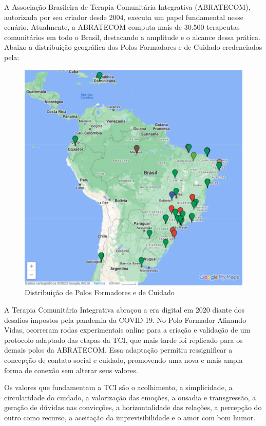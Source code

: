 A Associação Brasileira de Terapia Comunitária Integrativa (ABRATECOM), autorizada por seu criador desde 2004, executa um papel fundamental nesse cenário. Atualmente, a ABRATECOM computa mais de 30.500 terapeutas comunitários em todo o Brasil, destacando a amplitude e o alcance dessa prática.\cite{SILVAFRANCO} Abaixo a distribuição geográfica dos Polos Formadores e de Cuidado credenciados pela\cite{ABRATECOM}:

\begin{figure}[!h] %
    \centering
    \includegraphics[scale=0.7]{latex/figuras/polos.pdf}
    \caption[Terapia Comunitária Integrativa]%
    {Distribuição de Polos Formadores e de Cuidado}%
\end{figure}

A Terapia Comunitária Integrativa abraçou a era digital em 2020 diante dos desafios impostos pela pandemia da COVID-19. No Polo Formador Afinando Vidas, ocorreram rodas experimentais online para a criação e validação de um protocolo adaptado das etapas da TCI, que mais tarde foi replicado para os demais polos da ABRATECOM. Essa adaptação permitiu ressignificar a concepção de contato social e cuidado, promovendo uma nova e mais ampla forma de conexão sem alterar seus valores.\cite{SILVAeOTAVIANO}

Os valores que fundamentam a TCI são o acolhimento, a simplicidade, a circularidade do cuidado, a valorização das emoções, a ousadia e transgressão, a geração de dúvidas nas convicções, a horizontalidade das relações, a percepção do outro como recurso, a aceitação da imprevisibilidade e o amor com bom humor.\cite{SILVA}


